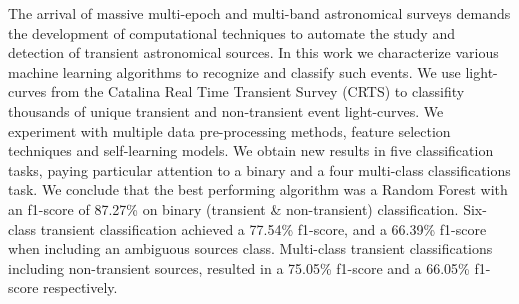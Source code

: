 


The arrival of massive multi-epoch and multi-band astronomical surveys
demands the development of computational techniques to automate the
study and detection of transient astronomical sources. 
In this work we characterize various machine learning algorithms to
recognize and classify such events.
We use light-curves from the Catalina Real Time Transient Survey
(CRTS) to classifity thousands of unique transient and non-transient
event light-curves.
We experiment  with multiple data pre-processing methods,
feature selection techniques and self-learning models. 
We obtain new results in five classification tasks, paying particular
attention to a binary and a four multi-class classifications task.  
We conclude that the best performing algorithm was
a Random Forest with an f1-score of 87.27\% on binary
(transient \& non-transient) classification. 
Six-class transient classification achieved a 77.54\% f1-score, and a
66.39\% f1-score when including an ambiguous sources class.
Multi-class transient classifications including non-transient sources,
resulted in a 75.05\% f1-score and a 66.05\% f1-score respectively.  
